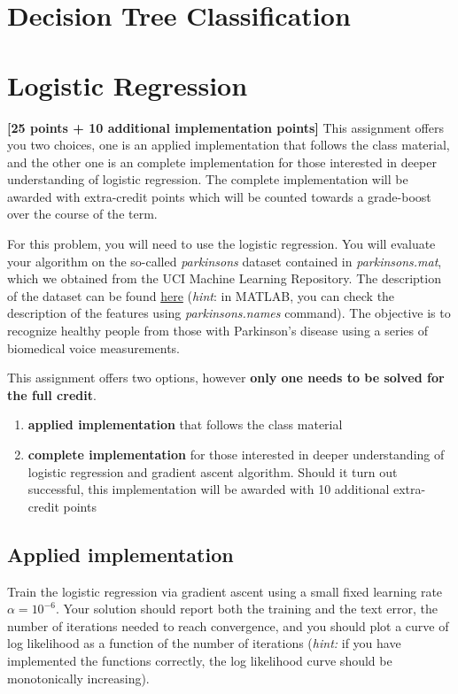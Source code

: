 \documentclass[12pt]{article}
\newenvironment{problem}[2][Problem:]{\begin{trivlist}
\item[\hskip \labelsep {\bfseries #1}\hskip \labelsep {\bfseries #2.}]}{\end{trivlist}}
\begin{document}
\pagebreak


\section{Decision Tree Classification}







\pagebreak

\section{Logistic Regression} 
\textbf{[25 points + 10 additional implementation points]} 
This assignment offers you two choices, one is an applied implementation that follows the class material, and the other one is an complete implementation for those interested in deeper understanding of logistic regression. The complete implementation will be awarded with extra-credit points which will be counted towards a grade-boost over the course of the term. 

For this problem, you will need to use the logistic regression.
You will evaluate your algorithm on the so-called \textit{parkinsons} dataset contained in \textit{parkinsons.mat}, which we
obtained from the UCI Machine Learning Repository. The description of the dataset can be found \href{https://archive.ics.uci.edu/ml/datasets/parkinsons+telemonitoring}{here} (\textit{hint}: in MATLAB, you can check the description of the features using \textit{parkinsons.names} command). The objective is to recognize healthy people from those with Parkinson's disease using a series of biomedical voice measurements.

This assignment offers two options, however \textbf{only one needs to be solved for the full credit}.
\begin{enumerate}
\item \textbf{applied implementation} that follows the class material
\item \textbf{complete implementation} for those interested in deeper understanding of logistic regression and gradient ascent algorithm. Should it turn out successful, this implementation will be awarded with 10 additional extra-credit points
\end{enumerate}


\subsection{Applied implementation}
\begin{problem}{Programming: Naive Logistic Regression [13 points]}
Train the logistic regression via gradient ascent using a small fixed learning rate $\alpha = 10^{-6}$. Your solution should report both the training and the text error, the number of iterations needed to reach convergence, and you should plot a curve of log likelihood as a function of the number of iterations (\textit{hint:} if you have implemented the functions correctly, the log likelihood curve should be monotonically increasing).
\end{problem}
\end{document}
